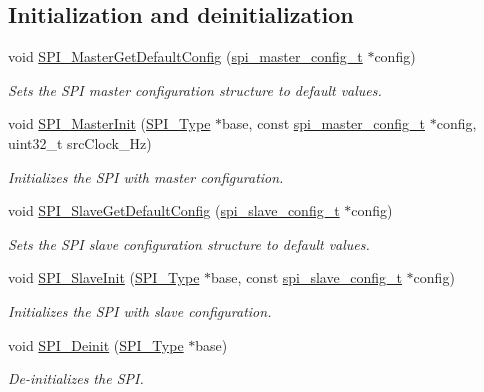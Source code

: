 \subsection*{Initialization and deinitialization}
\begin{DoxyCompactItemize}
\item 
void \mbox{\hyperlink{group__spi__driver_ga45c08fc078ae334b79fb844379140838}{S\+P\+I\+\_\+\+Master\+Get\+Default\+Config}} (\mbox{\hyperlink{group__spi__driver_ga15e5f834f83ba89de1e920bba9d00394}{spi\+\_\+master\+\_\+config\+\_\+t}} $\ast$config)
\begin{DoxyCompactList}\small\item\em Sets the S\+PI master configuration structure to default values. \end{DoxyCompactList}\item 
void \mbox{\hyperlink{group__spi__driver_ga3fe5b421b088cc98222b8a214069574b}{S\+P\+I\+\_\+\+Master\+Init}} (\mbox{\hyperlink{struct_s_p_i___type}{S\+P\+I\+\_\+\+Type}} $\ast$base, const \mbox{\hyperlink{group__spi__driver_ga15e5f834f83ba89de1e920bba9d00394}{spi\+\_\+master\+\_\+config\+\_\+t}} $\ast$config, uint32\+\_\+t src\+Clock\+\_\+\+Hz)
\begin{DoxyCompactList}\small\item\em Initializes the S\+PI with master configuration. \end{DoxyCompactList}\item 
void \mbox{\hyperlink{group__spi__driver_gac000b63ed033f57a9eee342a8c8e67f2}{S\+P\+I\+\_\+\+Slave\+Get\+Default\+Config}} (\mbox{\hyperlink{group__spi__driver_gaa62352a5d0a01f70fe74941809d03ec3}{spi\+\_\+slave\+\_\+config\+\_\+t}} $\ast$config)
\begin{DoxyCompactList}\small\item\em Sets the S\+PI slave configuration structure to default values. \end{DoxyCompactList}\item 
void \mbox{\hyperlink{group__spi__driver_ga91b214b5392fc8d5b73a5ebadc5ca363}{S\+P\+I\+\_\+\+Slave\+Init}} (\mbox{\hyperlink{struct_s_p_i___type}{S\+P\+I\+\_\+\+Type}} $\ast$base, const \mbox{\hyperlink{group__spi__driver_gaa62352a5d0a01f70fe74941809d03ec3}{spi\+\_\+slave\+\_\+config\+\_\+t}} $\ast$config)
\begin{DoxyCompactList}\small\item\em Initializes the S\+PI with slave configuration. \end{DoxyCompactList}\item 
void \mbox{\hyperlink{group__spi__driver_gaac0bc2b87ea2eb7eeba78d9449d4dbbf}{S\+P\+I\+\_\+\+Deinit}} (\mbox{\hyperlink{struct_s_p_i___type}{S\+P\+I\+\_\+\+Type}} $\ast$base)
\begin{DoxyCompactList}\small\item\em De-\/initializes the S\+PI. \end{DoxyCompactList}\end{DoxyCompactItemize}
